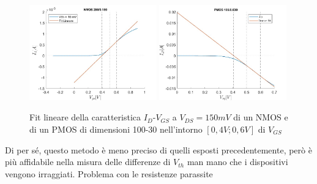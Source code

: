 \documentclass[12pt, letterpaper]{book}
\begin{document}
\begin{figure}[h!]
  \centering
  \includegraphics[width=0.49\textwidth]{LinearFit-N1-200-180}
  \includegraphics[width=0.49\textwidth]{LinearFit-P1-100-30}
  \caption{Fit lineare della caratteristica  $I_D$-$V_{GS}$ a $V_{DS}=150mV$ di un NMOS e di un PMOS di dimensioni 100-30 nell'intorno $[0,4V ; 0,6V]$ di $V_{GS}$}
\end{figure}

Di per sé, questo metodo è meno preciso di quelli esposti precedentemente, però è più affidabile nella misura delle differenze di $V_{th}$ man mano che i dispositivi vengono irraggiati. Problema con le resistenze parassite
\end{document}
